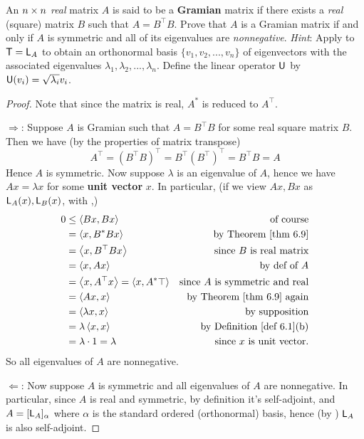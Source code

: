 \begin{exercise} \label{exercise 6.4.13}
An \(n \times n\) \emph{real} matrix \(A\) is said to be a \textbf{Gramian} matrix if there exists a \emph{real} (square) matrix \(B\) such that \(A = B^\top B\).
Prove that \(A\) is a Gramian matrix if and only if \(A\) is symmetric and all of its eigenvalues are \emph{nonnegative}.
\emph{Hint}: Apply  to \(\textsf{T} = \textsf{L}_A\) to obtain an orthonormal basis \(\{ v_1, v_2, ..., v_n \}\)
of eigenvectors with the associated eigenvalues \(\lambda_1, \lambda_2, ..., \lambda_n\).
Define the linear operator \(\textsf{U}\) by \(\textsf{U}(v_i) = \sqrt{\lambda_i} v_i\).
\end{exercise}

\begin{proof}
Note that since the matrix is real, \(A^*\) is reduced to \(A^\top\).

\(\Longrightarrow\): Suppose \(A\) is Gramian such that \(A = B^\top B\) for some real square matrix \(B\).
Then we have (by the properties of matrix transpose)
\[
    A^\top = (B^\top B)^\top = B^\top (B^\top)^\top = B^\top B = A
\]
Hence \(A\) is symmetric.
Now suppose \(\lambda\) is an eigenvalue of \(A\), hence we have \(Ax = \lambda x\) for some \textbf{unit vector} \(x\).
In particular, (if we view \(Ax, Bx\) as \(\textsf{L}_A(x), \textsf{L}_B(x)\), with ,)
\begin{align*}
    0 & \le \LG Bx, Bx \RG & \text{of course} \\
      & = \LG x, B^* B x \RG & \text{by \THM{6.9}} \\
      & = \LG x, B^\top B x \RG & \text{since \(B\) is real matrix} \\
      & = \LG x, Ax \RG & \text{by def of \(A\)} \\
      & = \LG x, A^\top x \RG = \LG x, A^* \top \RG & \text{since \(A\) is symmetric and real} \\
      & = \LG Ax, x \RG & \text{by \THM{6.9} again} \\
      & = \LG \lambda x, x \RG & \text{by supposition} \\
      & = \lambda \LG x, x \RG & \text{by \DEF{6.1}(b)} \\
      & = \lambda \cdot 1 = \lambda & \text{since \(x\) is unit vector}.
\end{align*}
So all eigenvalues of \(A\) are nonnegative.

\(\Longleftarrow\): Now suppose \(A\) is symmetric and all eigenvalues of \(A\) are nonnegative.
In particular, since \(A\) is real and symmetric, by definition it's self-adjoint, and \(A = [\textsf{L}_A]_{\alpha}\) where \(\alpha\) is the standard ordered (orthonormal) basis, hence (by ) \(\textsf{L}_A\) is also self-adjoint.


\end{proof}
